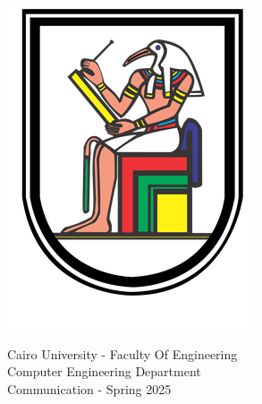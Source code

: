 \documentclass{article}
\begin{document}
\begin{titlepage}
    \begin{center}
        \begin{minipage}[c]{0.12\textwidth}
            \includegraphics[width=\textwidth]{Cairo_University_Crest.png}
        \end{minipage}
        \hfill
        \begin{minipage}[c]{0.5\textwidth}
            \centering
            {\large Cairo University - Faculty Of Engineering \\ Computer Engineering Department \\ Communication  - Spring 2025 \par}
        \end{minipage}
        \hfill
        \begin{minipage}[c]{0.15\textwidth}

\end{minipage}
\end{center}
\end{titlepage}
\end{document}
